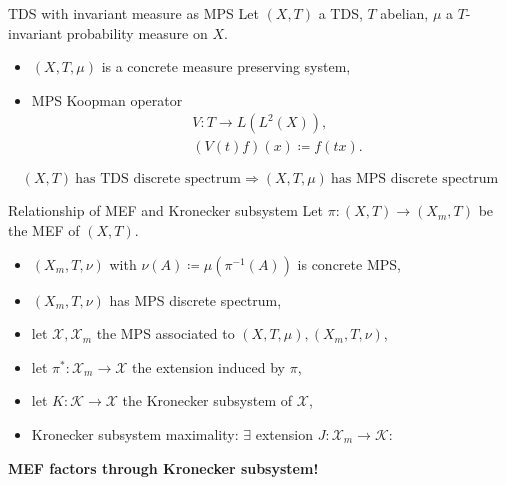 \begin{frame}{TDS with invariant measure as MPS}
Let $(X,T)$ a TDS, $T$ abelian, $\mu$ a $T$-invariant probability measure on $X$.
\begin{itemize}
  \item $(X,T,\mu)$ is a concrete measure preserving system,
      \item \pause MPS Koopman operator
\begin{equation*}
  \begin{split}
    &V : T \to L(L^2(X)),\\
    & (V(t) f)(x) \coloneq f (t x).
  \end{split}
\end{equation*}
\end{itemize}
\pause
\begin{proposition}
  \begin{equation*}
    (X,T) \ \text{has TDS discrete spectrum} \Rightarrow (X,T,\mu) \ \text{has MPS discrete spectrum}
  \end{equation*}
  \end{proposition}
\end{frame}
\begin{frame}[fragile]{Relationship of MEF and Kronecker subsystem}
  Let $\pi : (X,T) \to (X_m,T)$ be the MEF of $(X,T)$.
  \begin{itemize}
    \item $(X_m,T, \nu)$ with $\nu(A)\coloneq  \mu(\pi^{-1}(A))$ is concrete MPS,
    \item $(X_m,T, \nu)$ has MPS discrete spectrum,
    \item \pause let $\mathcal{X}, \mathcal{X}_m$ the MPS associated to $(X,T,\mu), (X_m,T,\nu)$,
  \item let $\pi^* : \mathcal{X}_m \to \mathcal{X}$ the extension induced by $\pi$,
  \item \pause let $K: \mathcal{K} \to \mathcal{X}$ the Kronecker subsystem of $\mathcal{X}$,
  \item Kronecker subsystem maximality: $\exists$ extension $J: \mathcal{X}_m \to \mathcal{K}$:
\end{itemize}
  \begin{center}
  \end{center}
  \pause
  \textbf{MEF factors through Kronecker subsystem!}
  \end{frame}

